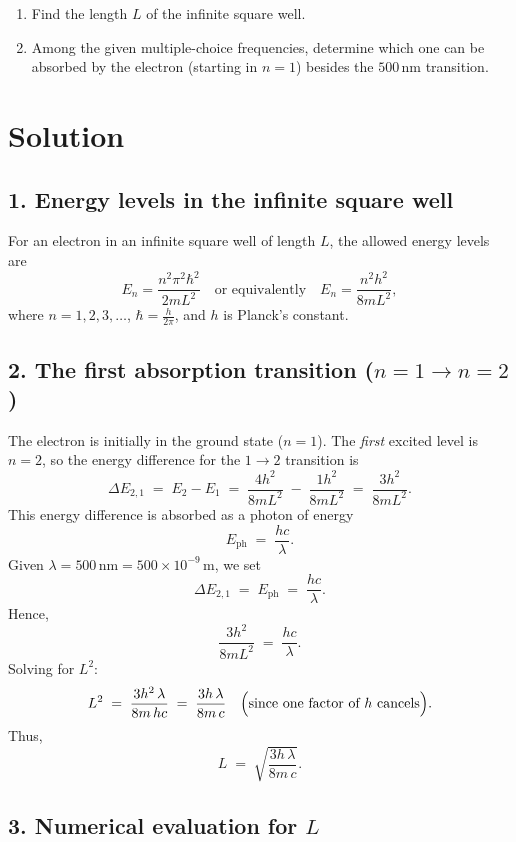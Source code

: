 \documentclass[12pt]{article}
\theoremstyle{definition} %
\theoremstyle{plain} %
\begin{document}
\begin{enumerate}
    \item Find the length $L$ of the infinite square well.
    \item Among the given multiple-choice frequencies, determine which one can be absorbed 
          by the electron (starting in $n=1$) besides the $500\,\text{nm}$ transition.
\end{enumerate}

\section*{Solution}

\subsection*{1. Energy levels in the infinite square well}

For an electron in an infinite square well of length $L$, the allowed energy levels are
\[
   E_n = \frac{n^2 \pi^2 \hbar^2}{2 m L^2}
   \quad\text{or equivalently}\quad
   E_n = \frac{n^2 h^2}{8 m L^2},
\]
where $n=1,2,3,\dots$, $\hbar = \frac{h}{2\pi}$, and $h$ is Planck's constant.

\subsection*{2. The first absorption transition ($n=1 \to n=2$)}

The electron is initially in the ground state ($n=1$). 
The {\em first} excited level is $n=2$, so the energy difference for the $1\to 2$ transition is
\[
   \Delta E_{2,1} \;=\; E_2 - E_1 
   \;=\; \frac{4 h^2}{8 m L^2} \;-\; \frac{1 h^2}{8 m L^2} 
   \;=\; \frac{3h^2}{8 m L^2}.
\]
This energy difference is absorbed as a photon of energy
\[
   E_{\text{ph}} \;=\; \frac{hc}{\lambda}.
\]
Given $\lambda = 500\,\text{nm} = 500\times 10^{-9}\,\text{m}$, we set
\[
   \Delta E_{2,1} \;=\; E_{\text{ph}} \;=\; \frac{hc}{\lambda}.
\]
Hence,
\[
   \frac{3h^2}{8 m L^2} 
   \;=\; \frac{hc}{\lambda}.
\]
Solving for $L^2$:
\[
   L^2 \;=\; \frac{3h^2\,\lambda}{8 m\,h c}
   \;=\; \frac{3h\,\lambda}{8 m\,c}
   \quad
   \Bigl(\text{since one factor of } h \text{ cancels}\Bigr).
\]
Thus,
\[
   L \;=\; \sqrt{\frac{3h\,\lambda}{8 m\,c}}.
\]

\subsection*{3. Numerical evaluation for $L$}
\end{document}
